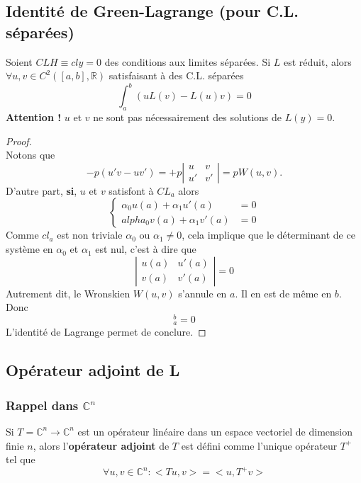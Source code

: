 \documentclass[11pt, a4paper, openany]{book}
\begin{document}
		\subsection{Identité de Green-Lagrange (pour C.L. séparées)}
		Soient $CLH \equiv cly = 0$ des conditions aux limites séparées. Si $L$ est réduit, alors $\forall u,v \in C^2([a,b],\mathbb{R})$ satisfaisant à des C.L. séparées
		\begin{equation}
			\int_a^b (uL(v) - L(u)v) = 0
		\end{equation}
		\textbf{Attention !} $u$ et $v$ ne sont pas nécessairement des solutions de $L(y) = 0$.
		\begin{proof}
			\ \\
			Notons que
			\begin{equation}
				-p(u'v - uv') = +p\left|\begin{array}{cc}
				u & v\\
				u' & v'
				\end{array}\right| = pW(u,v).
			\end{equation}
			D'autre part, \textbf{si}, $u$ et $v$ satisfont à $CL_a$ alors
			\begin{equation}
				\left\{\begin{array}{ll}
				\alpha_0u(a) + \alpha_1u'(a) &= 0\\alpha_0v(a) + \alpha_1v'(a) &= 0
				\end{array}\right.
			\end{equation}
			Comme $cl_a$ est non triviale $\alpha_0$ ou $\alpha_1 \neq 0$, cela implique que le déterminant de ce système en $\alpha_0$ et $\alpha_1$ est nul, c'est à dire que
			\begin{equation}
				\left|\begin{array}{cc}
				u(a) & u'(a)\\
				v(a) & v'(a)
				\end{array}\right| = 0
			\end{equation}
			Autrement dit, le Wronskien $W(u,v)$ s'annule en $a$. Il en est de même en $b$. Donc
			\begin{equation}
				[p(x)W(x;u,v)]_a^b = 0
			\end{equation}
			L'identité de Lagrange permet de conclure.
		\end{proof}
													
		\subsection{Opérateur adjoint de L}
		\subsubsection{Rappel dans $\mathbb{C}^n$}
		Si $T = \mathbb{C}^n \rightarrow \mathbb{C}^n$ est un opérateur linéaire dans un espace vectoriel de dimension finie $n$, alors l'\textbf{opérateur adjoint} de $T$ est défini comme l'unique opérateur $T^+$ tel que
		\begin{equation}
			\forall u, v \in \mathbb{C}^n : <Tu,v> = <u,T^+v>
		\end{equation}
													
\end{document}
